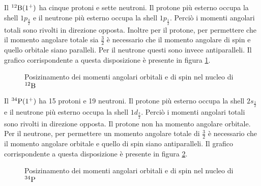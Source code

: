 \documentclass[../main.tex]{subfiles}
\begin{document}
\begin{svol}
		Il $ ^{12}\mathrm{B}(1^{+}) $ ha cinque protoni e sette neutroni. Il protone più esterno occupa la shell $ 1p_{\frac{3}{2}} $ e il neutrone più esterno occupa la shell $ 1p_{\frac{1}{2}} $. Perciò i momenti angolari totali sono rivolti in direzione opposta. Inoltre per il protone, per permettere che il momento angolare totale sia $ \frac{3}{2} $ è necessario che il momento angolare di spin e quello orbitale siano paralleli. Per il neutrone questi sono invece antiparalleli. Il grafico corrispondente a questa disposizione è presente in figura \ref{fig:12B}.
		\begin{figure}[h]
			\centering
			\caption{Posizinamento dei momenti angolari orbitali e di spin nel nucleo di $ ^{12}\mathrm{B} $}\label{fig:12B}
		\end{figure}

	
	Il $ ^{34}\mathrm{P}(1^{+}) $ ha 15 protoni e 19 neutroni. Il protone più esterno occupa la shell $ 2s_{\frac{1}{2}} $ e il neutrone più esterno occupa la shell $ 1d_{\frac{3}{2}} $. Perciò i momenti angolari totali sono rivolti in direzione opposta. Il protone non ha momento angolare orbitale. Per il neutrone, per permettere un momento angolare totale di $ \frac{3}{2} $ è necessario che il momento angolare orbitale e quello di spin siano antiparalleli. Il grafico corrispondente a questa disposizione è presente in figura \ref{fig:34P}.
	
	\begin{figure}[h]
		\centering
		\caption{Posizinamento dei momenti angolari orbitali e di spin nel nucleo di $ ^{34}\mathrm{P} $}\label{fig:34P}
	\end{figure}


\end{svol}
\end{document}
